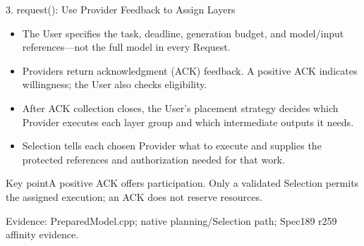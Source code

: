 \documentclass[10pt,aspectratio=169]{beamer}
\newcommand{\src}[1]{\vfill{\fontsize{6.5}{8}\selectfont\color{Gray}Evidence: #1\par}}
\newcommand{\point}[1]{\begin{block}{Key point}\small #1\end{block}}
\begin{document}
\begin{frame}{3. request(): Use Provider Feedback to Assign Layers}
\begin{center}\end{center}
\small
\begin{itemize}
\item The User specifies the task, deadline, generation budget, and model/input references---not the full model in every Request.
\item Providers return acknowledgment (ACK) feedback. A positive ACK indicates willingness; the User also checks eligibility.
\item After ACK collection closes, the User's placement strategy decides which Provider executes each layer group and which intermediate outputs it needs.
\item Selection tells each chosen Provider what to execute and supplies the protected references and authorization needed for that work.
\end{itemize}
\point{A positive ACK offers participation. Only a validated Selection permits the assigned execution; an ACK does not reserve resources.}
\src{PreparedModel.cpp; native planning/Selection path; Spec189 r259 affinity evidence.}
\end{frame}
\end{document}
